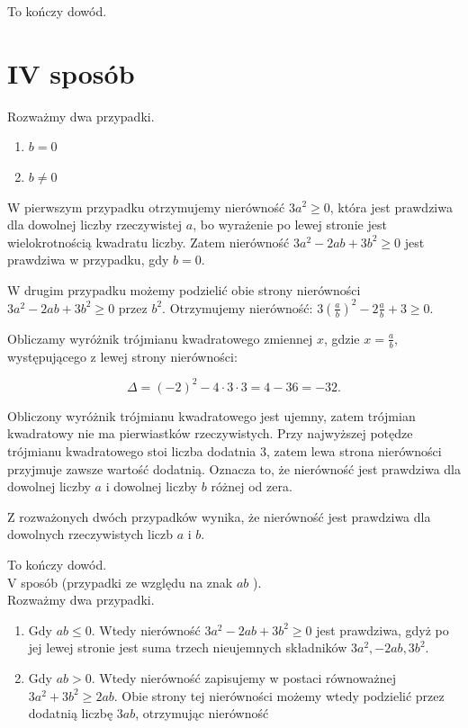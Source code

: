 \documentclass[10pt]{article}
\begin{document}
To kończy dowód.

\section*{IV sposób}
Rozważmy dwa przypadki.

\begin{enumerate}
  \item $b=0$
  \item $b \neq 0$
\end{enumerate}

W pierwszym przypadku otrzymujemy nierówność $3 a^{2} \geq 0$, która jest prawdziwa dla dowolnej liczby rzeczywistej $a$, bo wyrażenie po lewej stronie jest wielokrotnością kwadratu liczby. Zatem nierówność $3 a^{2}-2 a b+3 b^{2} \geq 0$ jest prawdziwa w przypadku, gdy $b=0$.

W drugim przypadku możemy podzielić obie strony nierówności $3 a^{2}-2 a b+3 b^{2} \geq 0$ przez $b^{2}$. Otrzymujemy nierówność: $3\left(\frac{a}{b}\right)^{2}-2 \frac{a}{b}+3 \geq 0$.

Obliczamy wyróżnik trójmianu kwadratowego zmiennej $x$, gdzie $x=\frac{a}{b}$, występującego z lewej strony nierówności:

$$
\Delta=(-2)^{2}-4 \cdot 3 \cdot 3=4-36=-32 .
$$

Obliczony wyróżnik trójmianu kwadratowego jest ujemny, zatem trójmian kwadratowy nie ma pierwiastków rzeczywistych. Przy najwyższej potędze trójmianu kwadratowego stoi liczba dodatnia 3, zatem lewa strona nierówności przyjmuje zawsze wartość dodatnią. Oznacza to, że nierówność jest prawdziwa dla dowolnej liczby $a$ i dowolnej liczby $b$ różnej od zera.

Z rozważonych dwóch przypadków wynika, że nierówność jest prawdziwa dla dowolnych rzeczywistych liczb $a$ i $b$.

To kończy dowód.\\
V sposób (przypadki ze względu na znak $a b$ ).\\
Rozważmy dwa przypadki.

\begin{enumerate}
  \item Gdy $a b \leq 0$. Wtedy nierówność $3 a^{2}-2 a b+3 b^{2} \geq 0$ jest prawdziwa, gdyż po jej lewej stronie jest suma trzech nieujemnych składników $3 a^{2},-2 a b, 3 b^{2}$.
  \item Gdy $a b>0$. Wtedy nierówność zapisujemy w postaci równoważnej $3 a^{2}+3 b^{2} \geq 2 a b$. Obie strony tej nierówności możemy wtedy podzielić przez dodatnią liczbę $3 a b$, otrzymując nierówność
\end{enumerate}
\end{document}
